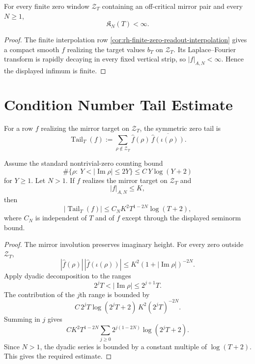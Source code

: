 \begin{lemma}
\label{lem:rh-finite-condition-number-is-finite}
For every finite zero window $\mathcal Z_T$ containing an off-critical
mirror pair and every $N\ge1$,
$$
\mathfrak K_N(T)<\infty.
$$
\end{lemma}

\begin{proof}
The finite interpolation row
\autoref{cor:rh-finite-zero-readout-interpolation} gives a compact
smooth $f$ realizing the target values $b_T$ on $\mathcal Z_T$.  Its
Laplace--Fourier transform is rapidly decaying in every fixed vertical
strip, so $|f|_{A,N}<\infty$.  Hence the displayed infimum is finite.
\end{proof}

\section{Condition Number Tail Estimate}
\label{sec:rh-condition-number-tail-estimate}

\begin{definition}
\label{def:rh-symmetric-zero-tail}
For a row $f$ realizing the mirror target on $\mathcal Z_T$, the
symmetric zero tail is
$$
\operatorname{Tail}_T(f)
:=
\sum_{\rho\notin\mathcal Z_T}
\widehat f(\rho)\,
\overline{\widehat f(\iota(\rho))}.
$$
\end{definition}

\begin{theorem}
\label{thm:rh-condition-number-zero-tail-bound}
Assume the standard nontrivial-zero counting bound
$$
\#\{\rho:\ Y<|\operatorname{Im}\rho|\le2Y\}
\le
C\,Y\log(Y+2)
$$
for $Y\ge1$.  Let $N>1$.  If $f$ realizes the mirror target on
$\mathcal Z_T$ and
$$
|f|_{A,N}\le K,
$$
then
$$
|\operatorname{Tail}_T(f)|
\le
C_N K^2 T^{1-2N}\log(T+2),
$$
where $C_N$ is independent of $T$ and of $f$ except through the displayed
seminorm bound.
\end{theorem}

\begin{proof}
The mirror involution preserves imaginary height.  For every zero
outside $\mathcal Z_T$,
$$
|\widehat f(\rho)|\,|\widehat f(\iota(\rho))|
\le
K^2(1+|\operatorname{Im}\rho|)^{-2N}.
$$
Apply dyadic decomposition to the ranges
$$
2^jT<|\operatorname{Im}\rho|\le2^{j+1}T.
$$
The contribution of the $j$th range is bounded by
$$
C\,2^jT\log(2^jT+2)\,K^2(2^jT)^{-2N}.
$$
Summing in $j$ gives
$$
C K^2T^{1-2N}
\sum_{j\ge0}2^{j(1-2N)}\log(2^jT+2).
$$
Since $N>1$, the dyadic series is bounded by a constant multiple of
$\log(T+2)$.  This gives the required estimate.
\end{proof}

